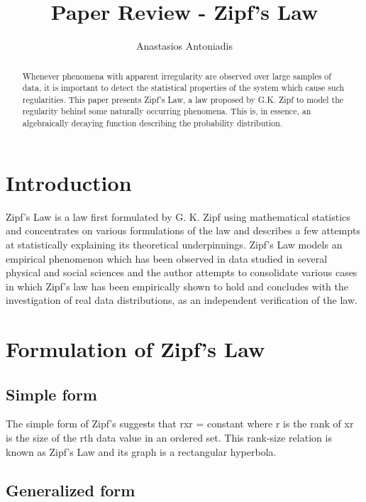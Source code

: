 \documentclass{article}
\begin{document}
\title{Paper Review - Zipf's Law}
\author{Anastasios Antoniadis}

\maketitle

\begin{abstract}

Whenever phenomena with apparent irregularity are observed over large
samples of data, it is important to detect the statistical properties
of the system which cause such regularities. This paper presents
Zipf's Law, a law proposed by G.K. Zipf to model the regularity behind 
some naturally occurring phenomena. This is, in essence, an
algebraically decaying function describing the probability distribution.
\end{abstract}

\section{Introduction}

Zipf's Law is a law first formulated by G. K. Zipf using mathematical
statistics and concentrates on various formulations of the law and
describes a few attempts at statistically explaining its theoretical
underpinnings. Zipf's Law models an empirical phenomenon which has been 
observed in data studied in several physical and social sciences and
the author attempts to consolidate various cases in which Zipf's law
has been empirically shown to hold and concludes with the
investigation of real data distributions, as an independent
verification of the law.

\section{Formulation of Zipf's Law} 
\subsection{Simple form}

The simple form of Zipf's suggests that rxr = constant where r is the
 rank of xr is the size of the rth data value in an ordered set. This
 rank-size relation is known as Zipf's Law and its graph is a
 rectangular hyperbola.

\subsection{Generalized form}
\end{document}
